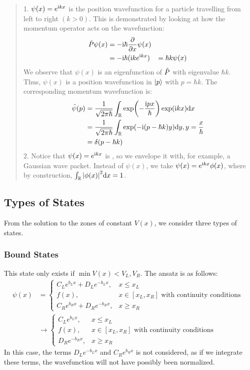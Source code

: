 \begin{quote}
    1. $\psi(x) = e^{\mathrm{i} k x}$ is the position wavefunction for a particle travelling from left to right $(k > 0)$. This is demonstrated by looking at how the momentum operator acts on the wavefunction:
    \begin{align*}
        \hat{P} \psi(x) &= -\mathrm{i} \hbar \pdv{x}\psi(x) \\
        &= -\mathrm{i}\hbar(\mathrm{i} k e^{\mathrm{i} k x}) 
        &= \hbar k \psi(x)
    \end{align*}
    We observe that $\psi(x)$ is an eigenfunction of $\hat{P}$ with eigenvalue $\hbar k$. \\
    Thus, $\psi(x)$ is a position wavefunction in $\ket{p}$ with $p = \hbar k$. The corresponding momentum wavefunction is:
    \begin{align*}
        \tilde{\psi}(p) &= \frac{1}{\sqrt{2\pi\hbar}} \int_{\mathbb{R}} \exp(-\frac{\mathrm{i} p x}{\hbar}) \exp(\mathrm{i} k x) \dd x \\
        &= \frac{1}{\sqrt{2\pi\hbar}} \int_{\mathbb{R}} \exp(-\mathrm{i} (p - \hbar k) y) \dd y, y = \frac{x}{\hbar} \\
        &= \delta(p - \hbar k)
    \end{align*}
    2. Notice that $\psi(x) = e^{\mathrm{i} k x}$ is , so we envelope it with, for example, a Gaussian wave packet. Instead of $\psi(x)$, we take $\psi(x) = e^{\mathrm{i} k x} \phi(x)$, where by construction, $\int_{\mathbb{R}} \abs{\phi(x)}^2 \dd x = 1$.
\end{quote}

\subsection{Types of States}
From the solution to the zones of constant $V(x)$, we consider three types of states.
\subsubsection{Bound States}
This state only exists if $\min V(x) < V_L, V_R$. The ansatz is as follows:
\begin{align*}
    \psi(x) &= \begin{cases}
        C_L e^{b_L x} + D_L e^{-b_L x}, & x \le x_L \\
        f(x), & x \in [x_L, x_R] \text{ with continuity conditions} \\
        C_R e^{b_R x} + D_R e^{-b_R x}, & x \ge x_R
    \end{cases} \\
        &\to \begin{cases}
        C_L e^{b_L x}, & x \le x_L \\
        f(x), & x \in [x_L, x_R] \text{ with continuity conditions} \\
        D_R e^{-b_R x}, & x \ge x_R
    \end{cases}
\end{align*}
In this case, the terms $D_L e^{-b_L x}$ and $C_R e^{b_R x}$ is not considered, as if we integrate these terms, the wavefunction will not have possibly been normalized.


